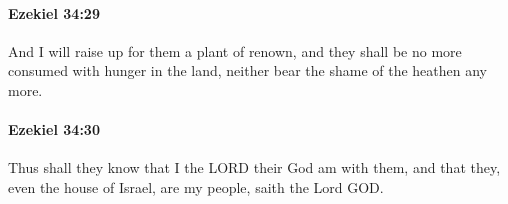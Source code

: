		\paragraph{Ezekiel 34:29} %
			\label{EZEKIEL-34-29}

			And I will raise up for them a plant of renown, and they shall be no more consumed with hunger in the land, neither bear the shame of the heathen any more.


		\paragraph{Ezekiel 34:30} %
			\label{EZEKIEL-34-30}

			Thus shall they know that I the LORD their God am with them, and that they, even the house of Israel, are my people, saith the Lord GOD.


